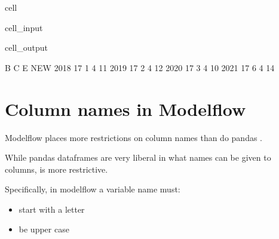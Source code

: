 \documentclass[letterpaper,10pt,english]{jupyterBook}
\begin{document}
\begin{sphinxuseclass}{cell}\begin{sphinxVerbatimInput}

\begin{sphinxuseclass}{cell_input}
\begin{sphinxVerbatim}[commandchars=\\\{\}]
\PYG{p}{[}\PYG{p}{]}
\end{sphinxVerbatim}

\end{sphinxuseclass}\end{sphinxVerbatimInput}
\begin{sphinxVerbatimOutput}

\begin{sphinxuseclass}{cell_output}
\begin{sphinxVerbatim}[commandchars=\\\{\}]
       B  C  E  NEW
2018  17  1  4   11
2019  17  2  4   12
2020  17  3  4   10
2021  17  6  4   14
\end{sphinxVerbatim}

\end{sphinxuseclass}\end{sphinxVerbatimOutput}

\end{sphinxuseclass}

\section{Column names in  Modelflow}
\label{\detokenize{content/04_PythonEssentials/PythonPandasDataframes:column-names-in-modelflow}}
\begin{sphinxShadowBox}

\sphinxAtStartPar
Modelflow places more restrictions on column names than do pandas .
\end{sphinxShadowBox}

\sphinxAtStartPar
While pandas dataframes are very liberal in what names can be given to columns,  is more restrictive.

\sphinxAtStartPar
Specifically, in modelflow a variable name must:
\begin{itemize}
\item {} 
\sphinxAtStartPar
start with a letter

\item {} 
\sphinxAtStartPar
be upper case

\end{itemize}
\end{document}

